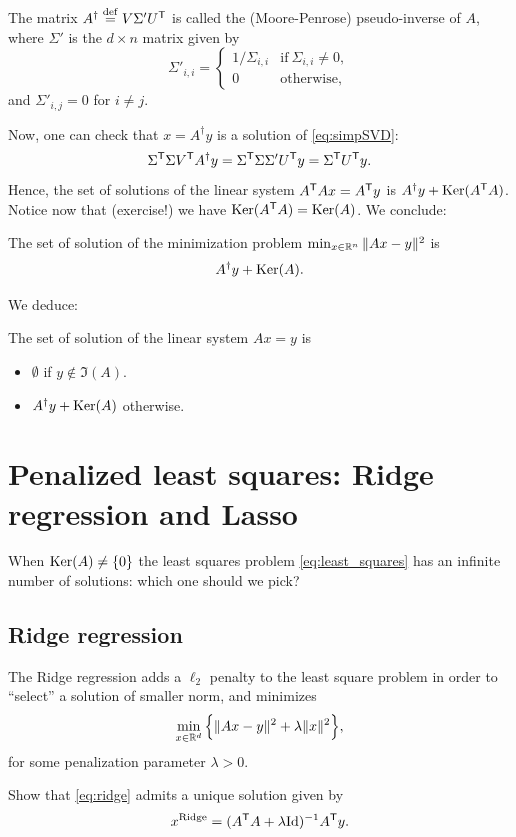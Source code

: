 \documentclass[11pt,nocut]{article}
\begin{document}
\begin{definition}
	The matrix $A^{\dagger} \overset{\rm def}{=} V \Sigma' U^{{\sf T}}$ is called the (Moore-Penrose) pseudo-inverse of $A$, where $\Sigma'$ is the $d \times n$ matrix given by 
	$$
	\Sigma'_{i,i} =
	\begin{cases}
		1 / \Sigma_{i,i} & \text{if} \ \Sigma_{i,i} \neq 0, \\
		0 & \text{otherwise},
	\end{cases}
	$$
	and $\Sigma'_{i,j} = 0$ for $i \neq j$.
\end{definition}

Now, one can check that $x = A^{\dagger}y$ is a solution of \eqref{eq:simpSVD}:
$$
\Sigma^{{\sf T}} \Sigma V^{{\sf T}} A^{\dagger} y =
\Sigma^{{\sf T}} \Sigma \Sigma' U^{{\sf T}} y =
\Sigma^{{\sf T}} U^{{\sf T}} y.
$$
Hence, the set of solutions of the linear system $A^{{\sf T}} A x = A^{{\sf T}} y$ is $A^{\dagger} y + {{\rm Ker}}(A^{{\sf T}}A)$. Notice now that (exercise!) we have ${{\rm Ker}}(A^{{\sf T}} A) = {{\rm Ker}}(A)$.
We conclude:

\begin{proposition}\label{prop:least_squares}
	The set of solution of the minimization problem $\min_{x \in \mathbb{R}^n} \|Ax - y\|^2$ is
	$$
	A^{\dagger} y + {{\rm Ker}}(A).
	$$
\end{proposition}

We deduce:
\begin{corollary}\label{cor:linear_system}
	The set of solution of the linear system $Ax = y$ is
	\begin{itemize}
		\item $\emptyset$ if $y \not\in \Im(A)$.
		\item $A^{\dagger}y + {{\rm Ker}}(A)$ otherwise.
	\end{itemize}
\end{corollary}


\section{Penalized least squares: Ridge regression and Lasso}

When ${{\rm Ker}}(A) \neq \{0\}$ the least squares problem \eqref{eq:least_squares} has an infinite number of solutions: which one should we pick?

\subsection{Ridge regression}

The Ridge regression adds a $\ell_2$ penalty to the least square problem in order to ``select'' a solution of smaller norm, and minimizes
\begin{equation}\label{eq:ridge}
	\min_{x \in \mathbb{R}^d} \Big\{ \| Ax - y \|^2 + \lambda \|x\|^2 \Big\},
\end{equation}
for some penalization parameter $\lambda >0$.
\begin{exercise}
	Show that \eqref{eq:ridge} admits a unique solution given by
	$$
	x^{\rm Ridge} = (A^{{\sf T}} A + \lambda {{\rm Id}})^{-1} A^{{\sf T}} y.
	$$
\end{exercise}
\end{document}
